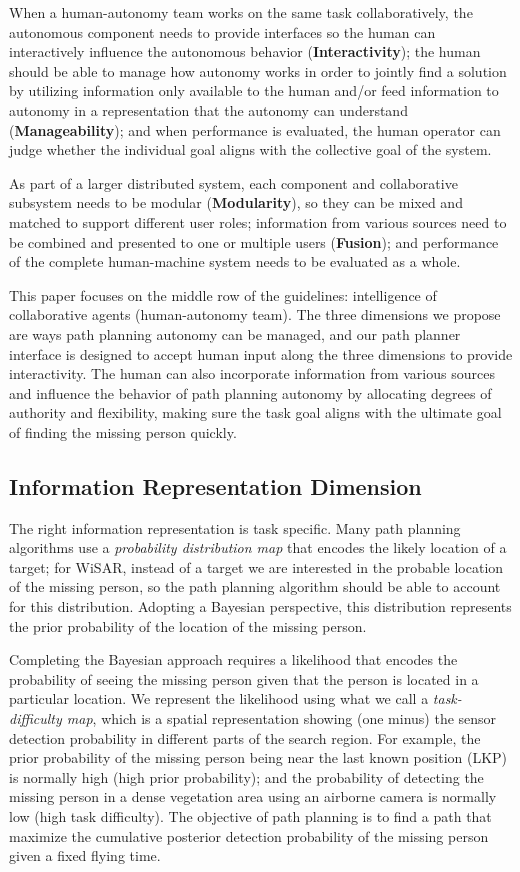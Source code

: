 When a human-autonomy team works on the same task collaboratively, the autonomous component needs to provide interfaces so the human can interactively influence the autonomous behavior (\textbf{Interactivity}); the human should be able to manage how autonomy works in order to jointly find a solution by utilizing information only available to the human and/or feed information to autonomy in a representation that the autonomy can understand (\textbf{Manageability}); and when performance is evaluated, the human operator can judge whether the individual goal aligns with the collective goal of the system. 

As part of a larger distributed system, each component and collaborative subsystem needs to be modular (\textbf{Modularity}), so they can be mixed and matched to support different user roles; information from various sources need to be combined and presented to one or multiple users (\textbf{Fusion}); and performance of the complete human-machine system needs to be evaluated as a whole. 

This paper focuses on the middle row of the guidelines: intelligence of collaborative agents (human-autonomy team). The three dimensions we propose are ways path planning autonomy can be managed, and our path planner interface is designed to accept human input along the three dimensions to provide interactivity. The human can also incorporate information from various sources and influence the behavior of path planning autonomy by allocating degrees of authority and flexibility, making sure the task goal aligns with the ultimate goal of finding the missing person quickly.

\subsection{Information Representation Dimension}

The right information representation is task specific. Many path planning algorithms use a \textit{probability distribution map} that encodes the likely location of a target; for WiSAR, instead of a target we are interested in the probable location of the missing person, so the path planning algorithm should be able to account for this distribution. Adopting a Bayesian perspective, this distribution represents the prior probability of the location of the missing person.

Completing the Bayesian approach requires a likelihood that encodes the probability of seeing the missing person given that the person is located in a particular location.  We represent the likelihood using what we call a \textit{task-difficulty map}, which is a spatial representation showing (one minus) the sensor detection probability in different parts of the search region. For example, the prior probability of the missing person being near the last known position (LKP) is normally high (high prior probability); and the probability of detecting the missing person in a dense vegetation area using an airborne camera is normally low (high task difficulty). The objective of path planning is to find a path that maximize the cumulative posterior detection probability of the missing person given a fixed flying time. 

